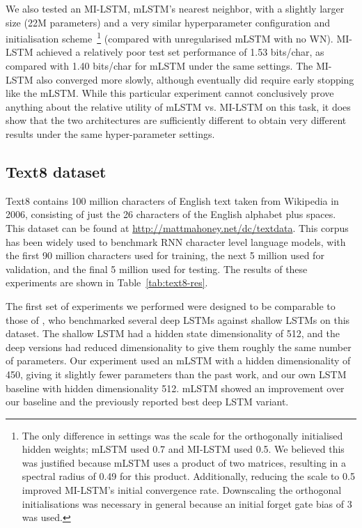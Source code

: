\documentclass{article}
\begin{document}
We also tested an MI-LSTM, mLSTM's nearest neighbor, with a slightly larger size (22M parameters) and a very similar hyperparameter configuration and initialisation scheme~\footnote{The only difference in settings was the scale for the orthogonally initialised hidden weights; mLSTM used 0.7 and MI-LSTM used 0.5. We believed this was justified because mLSTM uses a product of two matrices, resulting in a spectral radius of 0.49 for this product. Additionally, reducing the scale to 0.5 improved MI-LSTM's initial convergence rate. Downscaling the orthogonal initialisations was necessary in general because an initial forget gate bias of 3 was used.} (compared with unregularised mLSTM with no WN). MI-LSTM achieved a relatively poor test set performance of 1.53 bits/char, as compared with 1.40 bits/char for mLSTM under the same settings. The MI-LSTM also converged more slowly, although eventually did require early stopping like the mLSTM. While this particular experiment cannot conclusively prove anything about the relative utility of mLSTM vs. MI-LSTM on this task, it does show that the two architectures are sufficiently different to obtain very different results under the same hyper-parameter settings.
\subsection{Text8 dataset}
Text8 contains 100 million characters of English text taken from Wikipedia in 2006, consisting of just the 26 characters of the English alphabet plus spaces. This dataset can be found at \url{http://mattmahoney.net/dc/textdata}. This corpus has been widely used to benchmark RNN character level language models, with the first 90 million characters used for training, the next 5 million used for validation, and the final 5 million used for testing.  The results of these experiments are shown in Table~\ref{tab:text8-res}.

The first set of experiments we performed were designed to be comparable to those of \citet{zhang2016}, who benchmarked several deep LSTMs against shallow LSTMs on this dataset. The shallow LSTM had a hidden state dimensionality of 512, and the deep versions had reduced dimensionality to give them roughly the same number of parameters. Our experiment used an mLSTM with a hidden dimensionality of 450, giving it slightly fewer parameters than the past work, and our own LSTM baseline with hidden dimensionality 512. mLSTM showed an improvement over our baseline and the previously reported best deep LSTM variant. 
\end{document}

